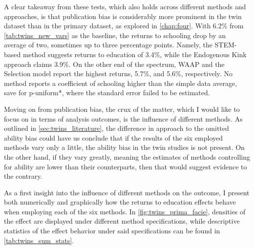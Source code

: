 A clear takeaway from these tests, which also holds across different methods and approaches, is that publication bias is considerably more prominent in the twin dataset than in the primary dataset, as explored in \autoref{chap:four}. With 6.2\% from \autoref{tab:twins_new_vars} as the baseline, the returns to schooling drop by an average of two, sometimes up to three percentage points. Namely, the STEM-based method suggests returns to education of 3.4\%, while the Endogenous Kink approach claims 3.9\%. On the other end of the spectrum, \ac{WAAP} and the Selection model report the highest returns, 5.7\%, and 5.6\%, respectively. No method reports a coefficient of schooling higher than the simple data average, save for p-uniform*, where the standard error failed to be estimated.

Moving on from publication bias, the crux of the matter, which I would like to focus on in terms of analysis outcomes, is the influence of different methods. As outlined in \autoref{sec:twins_literature}, the difference in approach to the omitted ability bias could have us conclude that if the results of the six employed methods vary only a little, the ability bias in the twin studies is not present. On the other hand, if they vary greatly, meaning the estimates of methods controlling for ability are lower than their counterparts, then that would suggest evidence to the contrary.

As a first insight into the influence of different methods on the outcome, I present both numerically and graphically how the returns to education effects behave when employing each of the six methods. In \autoref{fig:twins_prima_facie}, densities of the effect are displayed under different method specifications, while descriptive statistics of the effect behavior under said specifications can be found in \autoref{tab:twins_sum_stats}.

